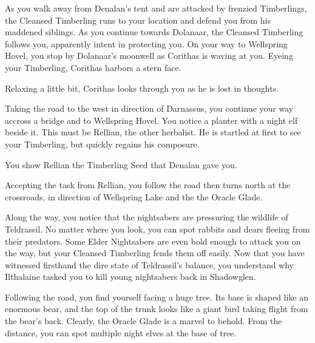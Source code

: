 As you walk away from Denalan's tent and are attacked by frenzied Timberlings, the Cleansed Timberling runs to your location and defend you from his maddened siblings. As you continue towards Dolanaar, the Cleansed Timberling follows you, apparently intent in protecting you. On your way to Wellspring Hovel, you stop by Dolanaar's moonwell as Corithas is waving at you. Eyeing your Timberling, Corithas harbors a stern face.


Relaxing a little bit, Corithas looks through you as he is lost in thoughts.


Taking the road to the west in direction of Darnassus, you continue your way accross a bridge and to Wellspring Hovel. You notice a planter with a night elf beside it. This must be Rellian, the other herbalist. He is startled at first to see your Timberling, but quickly regains his composure.


You show Rellian the Timberling Seed that Denalan gave you.



Accepting the task from Rellian, you follow the road then turns north at the crossroads, in direction of Wellspring Lake and the the Oracle Glade.

Along the way, you notice that the nightsabers are pressuring the wildlife of Teldrassil. No matter where you look, you can spot rabbits and dears fleeing from their predators. Some Elder Nightsabers are even bold enough to attack you on the way, but your Cleansed Timberling fends them off easily. Now that you have witnessed firsthand the dire state of Teldrassil's balance, you understand why Ilthalaine tasked you to kill young nightsabers back in Shadowglen.

Following the road, you find yourself facing a huge tree. Its base is shaped like an enormous bear, and the top of the trunk looks like a giant bird taking flight from the bear's back. Clearly, the Oracle Glade is a marvel to behold. From the distance, you can spot multiple night elves at the base of tree.

